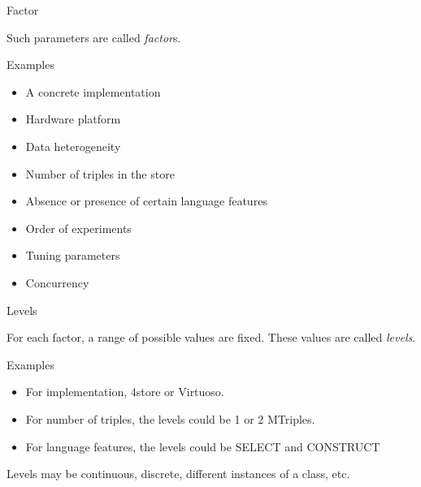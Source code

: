 \documentclass[english,handout,aspectratio=169]{ifislide}
\begin{document}
\begin{frame}{Factor}

\Large
Such parameters are called \emph{factor}s. 
\normalsize

\begin{block}{Examples}
  \begin{itemize}
  \item A concrete implementation
  \item Hardware platform
  \item Data heterogeneity
  \item Number of triples in the store
  \item Absence or presence of certain language features
  \item Order of experiments
  \item Tuning parameters
  \item Concurrency
  \end{itemize}
\end{block}

\end{frame}

\begin{frame}{Levels}

\Large
For each factor, a range of possible values are fixed. These values
are called \emph{levels}.
\normalsize

\begin{block}{Examples}
  \begin{itemize}
  \item For implementation, 4store or Virtuoso.
  \item For number of triples, the levels could be 1 or 2 MTriples.
  \item For language features, the levels could be \textsf{SELECT} and \textsf{CONSTRUCT}
  \end{itemize}
\end{block}
Levels may be continuous, discrete, different instances of a
class, etc.

\end{frame}
\end{document}
